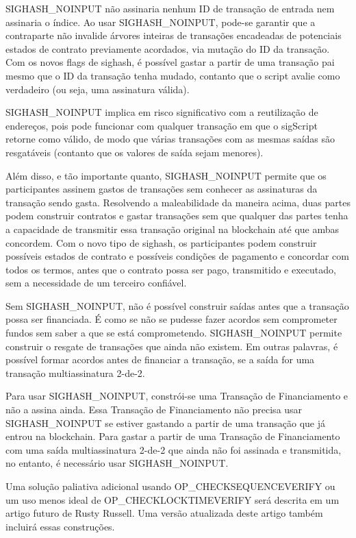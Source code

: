 \documentclass[letterpaper,11pt]{article}
\begin{document}
\begin{appendices}
SIGHASH\_NOINPUT não assinaria nenhum ID de transação de entrada nem
assinaria o índice. Ao usar SIGHASH\_NOINPUT, pode-se garantir que a
contraparte não invalide árvores inteiras de transações encadeadas de
potenciais estados de contrato previamente acordados, via mutação do ID
da transação. Com os novos flags de sighash, é possível gastar a partir de
uma transação pai mesmo que o ID da transação tenha mudado, contanto que o
script avalie como verdadeiro (ou seja, uma assinatura válida).

SIGHASH\_NOINPUT implica em risco significativo com a reutilização de
endereços, pois pode funcionar com qualquer transação em que o sigScript
retorne como válido, de modo que várias transações com as mesmas saídas são
resgatáveis (contanto que os valores de saída sejam menores).

Além disso, e tão importante quanto, SIGHASH\_NOINPUT permite que os
participantes assinem gastos de transações sem conhecer as assinaturas da
transação sendo gasta. Resolvendo a maleabilidade da maneira acima, duas
partes podem construir contratos e gastar transações sem que qualquer das
partes tenha a capacidade de transmitir essa transação original na
blockchain até que ambas concordem. Com o novo tipo de sighash, os
participantes podem construir possíveis estados de contrato e possíveis
condições de pagamento e concordar com todos os termos, antes que o
contrato possa ser pago, transmitido e executado, sem a necessidade de um
terceiro confiável.

Sem SIGHASH\_NOINPUT, não é possível construir saídas antes que a
transação possa ser financiada. É como se não se pudesse fazer acordos sem
comprometer fundos sem saber a que se está comprometendo.
SIGHASH\_NOINPUT permite construir o resgate de transações que ainda não
existem. Em outras palavras, é possível formar acordos antes de financiar
a transação, se a saída for uma transação multiassinatura 2-de-2.

Para usar SIGHASH\_NOINPUT, constrói-se uma Transação de Financiamento e
não a assina ainda. Essa Transação de Financiamento não precisa usar
SIGHASH\_NOINPUT se estiver gastando a partir de uma transação que já
entrou na blockchain. Para gastar a partir de uma Transação de
Financiamento com uma saída multiassinatura 2-de-2 que ainda não foi
assinada e transmitida, no entanto, é necessário usar SIGHASH\_NOINPUT.

Uma solução paliativa adicional usando OP\_CHECKSEQUENCEVERIFY ou um uso
menos ideal de OP\_CHECKLOCKTIMEVERIFY será descrita em um artigo futuro
de Rusty Russell. Uma versão atualizada deste artigo também incluirá essas
construções.

\end{appendices}



\end{document}
